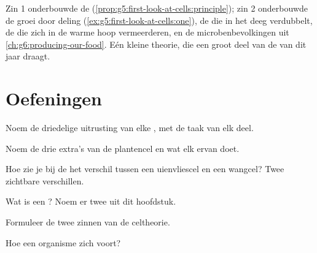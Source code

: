 \begin{example}\label{ex:g6:cell-unit-of-life:atwork}
Zin 1 onderbouwde de 
(\cref{prop:g5:first-look-at-cells:principle}); zin 2 onderbouwde de
groei door deling (\cref{ex:g5:first-look-at-cells:one}), de  die in
het deeg verdubbelt, de  die zich in de warme hoop
vermeerderen, en de microbenbevolkingen uit
\cref{ch:g6:producing-our-food}. Eén kleine theorie, die een groot deel
van de  van dit jaar draagt.
\end{example}

\section{Oefeningen}

\begin{exercise}[$\star$]\label{exo:g6:cell-unit-of-life:1}
Noem de driedelige uitrusting van elke , met de taak van elk deel.
\end{exercise}

\begin{exercise}[$\star$]\label{exo:g6:cell-unit-of-life:2}
Noem de drie extra's van de plantencel en wat elk ervan doet.
\end{exercise}

\begin{exercise}[$\star$]\label{exo:g6:cell-unit-of-life:3}
Hoe zie je bij de  het verschil tussen een uienvliescel en een
wangcel? Twee zichtbare verschillen.
\end{exercise}

\begin{exercise}[$\star$]\label{exo:g6:cell-unit-of-life:4}
Wat is een  ? Noem er twee uit dit hoofdstuk.
\end{exercise}

\begin{exercise}[$\star$]\label{exo:g6:cell-unit-of-life:5}
Formuleer de twee zinnen van de celtheorie.
\end{exercise}

\begin{exercise}[$\star$]\label{exo:g6:cell-unit-of-life:6}
Hoe  een  organisme zich voort?
\end{exercise}

